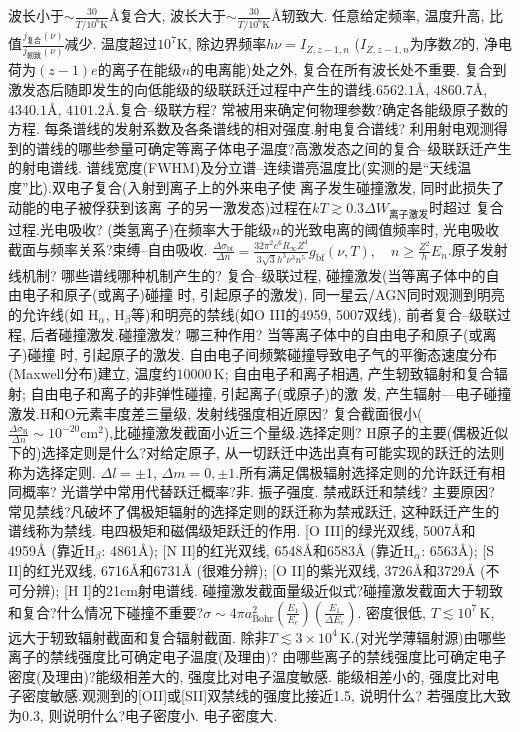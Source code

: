 \documentclass[12pt]{ctexart}
\theoremstyle{definition}
\begin{document}
波长小于$\sim\frac{30}{T/10^6\text{K}}\text{\AA}$复合大,
波长大于$\sim\frac{30}{T/10^6\text{K}}\text{\AA}$轫致大.
任意给定频率, 温度升高, 比值$\frac{j_\text{复合}(\nu)}{j_\text{轫致}(\nu)}$减少.
温度超过$10^7\text{K}$, 除边界频率$h\nu=I_{Z,z-1,n}$ ($I_{Z,z-1,n}$为序数$Z$的, 净电荷为$(z-1)e$的离子在能级$n$的电离能)处之外,
复合在所有波长处不重要.
复合到激发态后随即发生的向低能级的级联跃迁过程中产生的谱线.$6562.1\text{\AA}$, $4860.7\text{\AA}$, $4340.1\text{\AA}$, $4101.2\text{\AA}$.复合--级联方程? 常被用来确定何物理参数?确定各能级原子数的方程. 每条谱线的发射系数及各条谱线的相对强度.射电复合谱线? 利用射电观测得到的谱线的哪些参量可确定等离子体电子温度?高激发态之间的复合--级联跃迁产生的射电谱线. 谱线宽度(FWHM)及分立谱--连续谱亮温度比(实测的是``天线温度''比).双电子复合(入射到离子上的外来电子使
离子发生碰撞激发, 同时此损失了动能的电子被俘获到该离
子的另一激发态)过程在$kT\gtrsim0.3\Delta W_\text{离子激发}$时超过
复合过程.光电吸收? (类氢离子)在频率大于能级$n$的光致电离的阈值频率时, 光电吸收截面与频率关系?束缚--自由吸收. $\frac{\Delta \sigma_\text{bf}}{\Delta n}=\frac{32\pi^2e^6R_\infty Z^4}{3\sqrt{3}h^3\nu^3n^5}g_\text{bf}(\nu,T),\quad n\ge \frac{Z^2}{h}E_n$.原子发射线机制? 哪些谱线哪种机制产生的?
复合--级联过程, 碰撞激发(当等离子体中的自由电子和原子(或离子)碰撞
时, 引起原子的激发). 同一星云/AGN同时观测到明亮的允许线(如
H${}_\alpha$, H${}_\beta$等)和明亮的禁线(如O III的4959, 5007双线), 前者复合--级联过程, 后者碰撞激发.碰撞激发? 哪三种作用?
当等离子体中的自由电子和原子(或离子)碰撞
时, 引起原子的激发. 自由电子间频繁碰撞导致电子气的平衡态速度分布
(Maxwell分布)建立, 温度约$10000\,\text{K}$;
自由电子和离子相遇, 产生轫致辐射和复合辐射;
自由电子和离子的非弹性碰撞, 引起离子(或原子)的激
发, 产生辐射---电子碰撞激发.H和O元素丰度差三量级, 发射线强度相近原因?
复合截面很小($\frac{\Delta \sigma_\text{R}}{\Delta n}\sim10^{-20}\text{cm}^2$),比碰撞激发截面小近三个量级.选择定则? H原子的主要(偶极近似下的)选择定则是什么?对给定原子, 从一切跃迁中选出真有可能实现的跃迁的法则称为选择定则. $\Delta l=\pm1$, $\Delta m=0,\pm1$.所有满足偶极辐射选择定则的允许跃迁有相同概率? 光谱学中常用代替跃迁概率?非. 振子强度.
禁戒跃迁和禁线? 主要原因? 常见禁线?凡破坏了偶极矩辐射的选择定则的跃迁称为禁戒跃迁, 这种跃迁产生的谱线称为禁线.
电四极矩和磁偶级矩跃迁的作用.
$\text{}$[O III]的绿光双线, 5007\AA{}和4959\AA{} (靠近H${}_\beta$: 4861\AA);
$\text{}$[N II]的红光双线, 6548\AA{}和6583\AA{} (靠近H${}_\alpha$: 6563\AA);
$\text{}$[S II]的红光双线, 6716\AA{}和6731\AA{} (很难分辨);
$\text{}$[O II]的紫光双线, 3726\AA{}和3729\AA{} (不可分辨);
$\text{}$[H I]的21cm射电谱线.
碰撞激发截面量级近似式?碰撞激发截面大于轫致和复合?什么情况下碰撞不重要?$\sigma\sim4\pi a_\text{Bohr}^2\left(\frac{E_1}{E_e}\right)\left(  \frac{E_1}{\Delta E_e}\right)$. 密度很低, $T\lesssim10^7\,\text{K}$, 远大于轫致辐射截面和复合辐射截面. 除非$T\lesssim3\times10^4\,\text{K}$.(对光学薄辐射源)由哪些离子的禁线强度比可确定电子温度(及理由)? 由哪些离子的禁线强度比可确定电子密度(及理由)?能级相差大的, 强度比对电子温度敏感. 能级相差小的, 强度比对电子密度敏感.观测到的[OII]或[SII]双禁线的强度比接近1.5, 说明什么? 若强度比大致为0.3, 则说明什么?电子密度小. 电子密度大.
\end{document}

